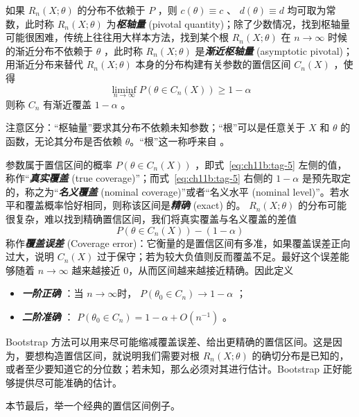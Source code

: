 如果 $R_n(X;\theta)$ 的分布不依赖于 $P$ ，则 $c(\theta)\equiv c$ 、 $d(\theta)\equiv d$ 均可取为常数，此时称 $R_n(X;\theta)$ 为\textbf{\emph{枢轴量}} (pivotal quantity)；除了少数情况，找到枢轴量可能很困难，传统上往往用大样本方法，找到某个根 $R_n(X;\theta)$ 在 $n\to\infty$ 时候的渐近分布不依赖于 $\theta$ ，此时称 $R_n(X;\theta)$ 是\textbf{\emph{渐近枢轴量 }} (asymptotic pivotal)；用渐近分布来替代 $R_n(X;\theta)$ 本身的分布构建有关参数的置信区间 $C_n(X)$ ，使得
\[\liminf_{n\to\infty}P(\theta\in C_n(X))\ge 1-\alpha\]
则称 $C_n$ 有渐近覆盖 $1-\alpha$ 。

\begin{remark}
注意区分：``枢轴量''要求其分布不依赖未知参数；``根''可以是任意关于 $X$ 和 $\theta$ 的函数，无论其分布是否依赖 $\theta$。``根''这一称呼来自 \cite{beran1987}。
\end{remark}

参数属于置信区间的概率 $P(\theta\in C_n(X))$ ，即式~\eqref{eq:ch11b:tag-5} 左侧的值，称作``\textbf{\emph{真实覆盖 }} (true coverage)''；而式~\eqref{eq:ch11b:tag-5} 右侧的 $1-\alpha$ 是预先取定的，称之为``\textbf{\emph{名义覆盖 }} (nominal coverage)''或者``名义水平 (nominal level)''。若水平和覆盖概率恰好相同，则称该区间是\textbf{\emph{精确}} (exact) 的。 $R_n(X;\theta)$ 的分布可能很复杂，难以找到精确置信区间，我们将真实覆盖与名义覆盖的差值
\[P(\theta\in C_n(X))-(1-\alpha)\]
称作\textbf{\emph{覆盖误差}} (Coverage error)：它衡量的是置信区间有多准，如果覆盖误差正向过大，说明 $C_n(X)$ 过于保守；若为较大负值则反而覆盖不足。最好这个误差能够随着 $n\to\infty$ 越来越接近 0，从而区间越来越接近精确。因此定义

\begin{itemize}
\tightlist
\item
  \textbf{\emph{一阶正确}} ：当 $n\to\infty$时， $P(\theta_0\in C_n)\to 1-\alpha$ ；
\item
  \textbf{\emph{二阶准确}} ： $P(\theta_0\in C_n)=1-\alpha+O(n^{-1})$ 。
\end{itemize}

Bootstrap 方法可以用来尽可能缩减覆盖误差、给出更精确的置信区间。这是因为，要想构造置信区间，就说明我们需要对根 $R_n(X;\theta)$ 的确切分布是已知的，或者至少要知道它的分位数；若未知，那么必须对其进行估计。Bootstrap 正好能够提供尽可能准确的估计。

本节最后，举一个经典的置信区间例子。

